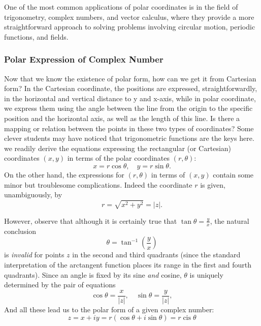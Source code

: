 \documentclass[
	12pt, %
	fleqn, %
	a4paper, %
]{LegrandOrangeBook}
\begin{document}
One of the most common applications of polar coordinates is in the field of trigonometry, complex numbers, and vector calculus, where they provide a more straightforward approach to solving problems involving circular motion, periodic functions, and fields.

\subsubsection{Polar Expression of Complex Number}
Now that we know the existence of polar form, how can we get it from Cartesian form? In the Cartesian coordinate,
the positions are expressed, straightforwardly, in the horizontal and vertical distance to y and x-axis, while in polar
coordinate, we express them using the angle between the line from the origin to the specific position and the horizontal axis, as well
as the length of this line. Is there a mapping or relation between the points in these two types of coordinates? Some clever students
may have noticed that trigonometric functions are the keys here.
we readily derive the equations expressing the rectangular (or Cartesian) coordinates $(x, y)$ in terms of the polar coordinates $(r, \theta)$:
\begin{equation}
x = r \cos \theta, \quad y = r \sin \theta. 
\end{equation}
On the other hand, the expressions for $(r, \theta)$ in terms of $(x, y)$ contain some minor but troublesome complications. Indeed the coordinate $r$ is given, unambiguously, by
\begin{equation}
r = \sqrt{x^2 + y^2} = |z|. 
\end{equation}

However, observe that although it is certainly true that $\tan \theta = \frac{y}{x}$, the natural conclusion
\begin{equation}
\theta = \tan^{-1}\left(\frac{y}{x}\right)
\end{equation}
is \textit{invalid} for points $z$ in the second and third quadrants (since the standard interpretation of the arctangent function places its range in the first and fourth quadrants). Since an angle is fixed by its sine \textit{and} cosine, $\theta$ is uniquely determined by the pair of equations
\begin{equation}
\cos \theta = \frac{x}{|z|}, \quad \sin \theta = \frac{y}{|z|}, 
\end{equation}
And all these lead us to the polar form of a given complex number:
\begin{equation}
    z=x+iy=r(\cos\theta+i\sin\theta)=r\operatorname{cis}\theta
\end{equation}
\end{document}
